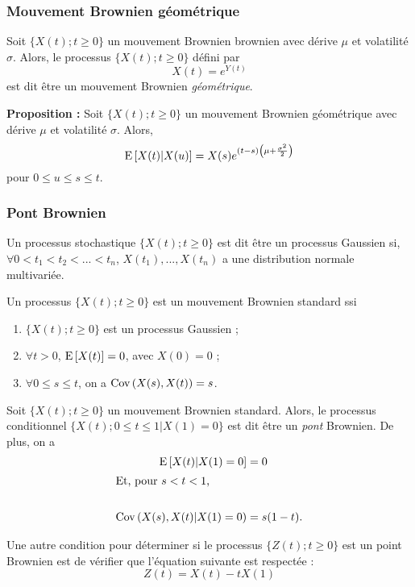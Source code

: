 \documentclass[10pt, french]{article}
\begin{document}
\begin{multicols*}{2}
\subsubsection*{Mouvement Brownien géométrique}
\begin{definition}[Définition]
Soit $\{X(t) ; t \geq 0 \}$ un mouvement Brownien brownien avec dérive $\mu$ et volatilité $\sigma$. Alors, le processus $\{X(t) ; t \geq 0 \}$ défini par
\[X(t) = e^{Y(t)}\]
est dit être un mouvement Brownien \emph{géométrique}.
\end{definition}
\textbf{Proposition : } Soit $\{X(t) ; t \geq 0 \}$ un mouvement Brownien géométrique avec dérive $\mu$ et volatilité $\sigma$. Alors,
\[\mathrm{E} \left[ X(t) | X(u) \right] = X(s) e^{(t-s) \left(\mu + \frac{\sigma^2}{2} \right)} \]
pour $ 0 \leq u \leq s \leq t$.

\subsubsection*{Pont Brownien}
\begin{definition}
Un processus stochastique $\{X(t) ; t \geq 0 \}$ est dit être un processus Gaussien si, $\forall 0 < t_1 < t_2 < ... < t_n$, $X(t_1), ..., X(t_n)$ a une distribution normale multivariée.
\end{definition}

\begin{definition}
Un processus $\{X(t) ; t \geq 0 \}$ est un mouvement Brownien standard ssi
\begin{enumerate}[label=(\arabic*)]
\item $\{X(t) ; t \geq 0 \}$ est un processus Gaussien ;
\item $\forall t > 0$, $\mathrm{E} \left[ X(t) \right] = 0$, avec $X(0) = 0$ ;
\item $\forall 0 \leq s \leq t$, on a $\mathrm{Cov} \left( X(s), X(t) \right) = s$.
\end{enumerate}
\end{definition}

\begin{definition}
Soit $\{X(t) ; t \geq 0 \}$ un mouvement Brownien standard. Alors, le processus conditionnel $\{X(t) ; 0 \leq t \leq 1 | X(1) = 0 \}$ est dit être un \emph{pont} Brownien.  De plus, on a
\begin{align*}
\mathrm{E} \left[ X(t) | X(1) = 0 \right] & = 0 \\
\shortintertext{Et, pour $s < t < 1$,} \\
\mathrm{Cov} \left( X(s), X(t) | X(1) = 0 \right) & = s(1-t). \\
\end{align*}
\end{definition}
Une autre condition pour déterminer si le processus $\{ Z(t) ; t \geq 0 \}$ est un point Brownien est de vérifier que l'équation suivante est respectée : 
\[Z(t) = X(t) - t X(1) \]


\end{multicols*}
\end{document}
